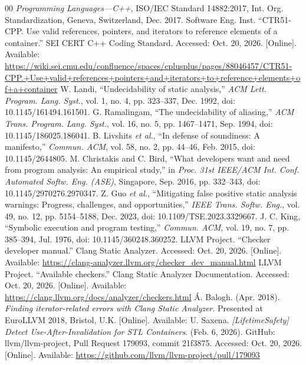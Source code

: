 \documentclass[conference]{IEEEtran}
\begin{document}
\begin{thebibliography}{00}
 \textit{Programming Languages---C++}, ISO/IEC Standard 14882:2017, Int. Org. Standardization, Geneva, Switzerland, Dec. 2017.
 Software Eng. Inst. ``CTR51-CPP. Use valid references, pointers, and iterators to reference elements of a container.'' SEI CERT C++ Coding Standard. Accessed: Oct. 20, 2026. [Online]. Available: \url{https://wiki.sei.cmu.edu/confluence/spaces/cplusplus/pages/88046457/CTR51-CPP.+Use+valid+references+pointers+and+iterators+to+reference+elements+of+a+container}
 W. Landi, ``Undecidability of static analysis,'' \textit{ACM Lett. Program. Lang. Syst.}, vol. 1, no. 4, pp. 323--337, Dec. 1992, doi: 10.1145/161494.161501.
 G. Ramalingam, ``The undecidability of aliasing,'' \textit{ACM Trans. Program. Lang. Syst.}, vol. 16, no. 5, pp. 1467--1471, Sep. 1994, doi: 10.1145/186025.186041.
 B. Livshits \textit{et al.}, ``In defense of soundiness: A manifesto,'' \textit{Commun. ACM}, vol. 58, no. 2, pp. 44--46, Feb. 2015, doi: 10.1145/2644805.
 M. Christakis and C. Bird, ``What developers want and need from program analysis: An empirical study,'' in \textit{Proc. 31st IEEE/ACM Int. Conf. Automated Softw. Eng. (ASE)}, Singapore, Sep. 2016, pp. 332--343, doi: 10.1145/2970276.2970347.
 Z. Guo \textit{et al.}, ``Mitigating false positive static analysis warnings: Progress, challenges, and opportunities,'' \textit{IEEE Trans. Softw. Eng.}, vol. 49, no. 12, pp. 5154--5188, Dec. 2023, doi: 10.1109/TSE.2023.3329667.
 J. C. King, ``Symbolic execution and program testing,'' \textit{Commun. ACM}, vol. 19, no. 7, pp. 385--394, Jul. 1976, doi: 10.1145/360248.360252.
 LLVM Project. ``Checker developer manual.'' Clang Static Analyzer. Accessed: Oct. 20, 2026. [Online]. Available: \url{https://clang-analyzer.llvm.org/checker_dev_manual.html}
 LLVM Project. ``Available checkers.'' Clang Static Analyzer Documentation. Accessed: Oct. 20, 2026. [Online]. Available: \url{https://clang.llvm.org/docs/analyzer/checkers.html}
 \'{A}. Balogh. (Apr. 2018). \textit{Finding iterator-related errors with Clang Static Analyzer}. Presented at EuroLLVM 2018, Bristol, U.K. [Online]. Available: \urlbalogh
{} U. Saxena. \textit{[LifetimeSafety] Detect Use-After-Invalidation for STL Containers}. (Feb. 6, 2026). GitHub: llvm/llvm-project, Pull Request 179093, commit 21f3875. Accessed: Oct. 20, 2026. [Online]. Available: \url{https://github.com/llvm/llvm-project/pull/179093}

\end{thebibliography}
\end{document}
